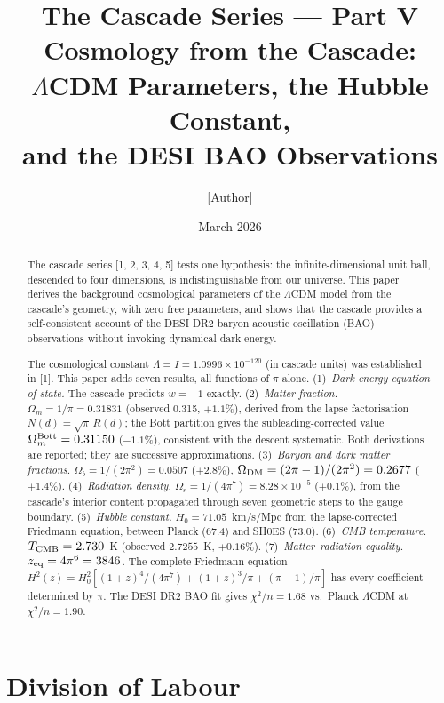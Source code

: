 \documentclass[12pt,a4paper]{article}
\title{\textbf{The Cascade Series --- Part V}\\[6pt]
Cosmology from the Cascade:\\
$\Lambda$CDM Parameters, the Hubble Constant,\\
and the DESI BAO Observations}
\author{[Author]}
\date{March 2026}
\begin{document}
\maketitle

\begin{abstract}
The cascade series [1, 2, 3, 4, 5] tests one hypothesis: the infinite-dimensional
unit ball, descended to four dimensions, is indistinguishable from our universe.
This paper derives the background cosmological parameters of the $\Lambda$CDM model
from the cascade's geometry, with zero free parameters, and shows that the cascade
provides a self-consistent account of the DESI DR2 baryon acoustic oscillation (BAO)
observations without invoking dynamical dark energy.

The cosmological constant $\Lambda = I = 1.0996 \times 10^{-120}$ (in cascade units) was
established in [1]. This paper adds seven results, all functions of $\pi$ alone.
(1)~\emph{Dark energy equation of state.} The cascade predicts $w = -1$ exactly.
(2)~\emph{Matter fraction.} $\Omega_m = 1/\pi = 0.31831$ (observed 0.315, $+1.1\%$), derived
from the lapse factorisation $N(d) = \sqrt{\pi}\,R(d)$; the Bott partition gives the
subleading-corrected value $\Omega_m^{\rm Bott} = 0.31150$ ($-1.1\%$), consistent with the
descent systematic. Both derivations are reported; they are successive approximations.
(3)~\emph{Baryon and dark matter fractions.} $\Omega_b = 1/(2\pi^2) = 0.0507$ ($+2.8\%$),
$\Omega_{\rm DM} = (2\pi-1)/(2\pi^2) = 0.2677$ ($+1.4\%$).
(4)~\emph{Radiation density.} $\Omega_r = 1/(4\pi^7) = 8.28 \times 10^{-5}$ ($+0.1\%$),
from the cascade's interior content propagated through seven geometric steps to the
gauge boundary.
(5)~\emph{Hubble constant.} $H_0 = 71.05$~km/s/Mpc from the lapse-corrected Friedmann
equation, between Planck (67.4) and SH0ES (73.0).
(6)~\emph{CMB temperature.} $T_{\rm CMB} = 2.730$~K (observed $2.7255$~K, $+0.16\%$).
(7)~\emph{Matter--radiation equality.} $z_{\rm eq} = 4\pi^6 = 3846$.
The complete Friedmann equation
$H^2(z) = H_0^2[(1+z)^4/(4\pi^7) + (1+z)^3/\pi + (\pi-1)/\pi]$
has every coefficient determined by $\pi$.
The DESI DR2 BAO fit gives $\chi^2/n = 1.68$ vs.\ Planck $\Lambda$CDM at $\chi^2/n = 1.90$.
\end{abstract}

\tableofcontents
\newpage

\section{Division of Labour}
\end{document}
